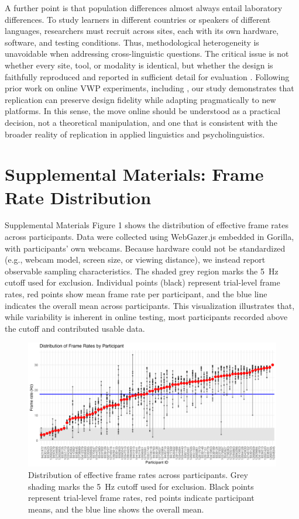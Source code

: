 \documentclass[sn-apa]{sn-jnl} %
\begin{document}
A further point is that population differences almost always entail laboratory
differences. To study learners in different countries or speakers of different
languages, researchers must recruit across sites, each with its own hardware,
software, and testing conditions. Thus, methodological heterogeneity is
unavoidable when addressing cross-linguistic questions. The critical issue is
not whether every site, tool, or modality is identical, but whether the design
is faithfully reproduced and reported in sufficient detail for evaluation
\parencite{mcmanus2024}. Following prior work on online VWP experiments,
including \textcite{AOW}, our study demonstrates that replication can
preserve design fidelity while adapting pragmatically to new platforms. In this
sense, the move online should be understood as a practical decision, not a theoretical manipulation, and one that is consistent with the broader reality of replication in applied linguistics and psycholinguistics.


\section{Supplemental Materials: Frame Rate Distribution}

\noindent
Supplemental Materials Figure 1 shows the distribution of effective frame rates across participants. Data were collected using 
WebGazer.js embedded in Gorilla, with participants’ own webcams. Because hardware could not be standardized (e.g., webcam model, screen size, or viewing 
distance), we instead report observable sampling characteristics. The shaded grey region marks the 5~Hz cutoff used for exclusion. Individual points (black) 
represent trial-level frame rates, red points show mean frame rate per participant, and the blue line indicates the overall mean across participants. This visualization illustrates that, while variability is inherent in online testing, most participants recorded above the cutoff and contributed usable data.

\begin{figure}[h]
    \centering
    \includegraphics[width=\textwidth]{viz/fr.png}
    \caption{Distribution of effective frame rates across participants. Grey 
    shading marks the 5~Hz cutoff used for exclusion. Black points represent 
    trial-level frame rates, red points indicate participant means, and the 
    blue line shows the overall mean.}
    \label{fig:frame_rate}
\end{figure}
\end{document}
